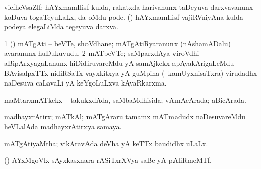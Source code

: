 {{{{{{\bentry
{} 
\gl{\nA}
\bmng
vicfheVsaZlf: 
\banum
{} hAYxmamIlisf kulda, rakatxda harivanunx taDeyuva darxvavanunx koDuva togaTeyuLaLx, \ame da oMdu pode. 
 (\kanmu) hAYxmamIlisf vajiRVniyAna kulda podeya elegaLiMda tegeyuva darxva. 
\eanum
\emng
\eentry

\bentry
{} 
\gl{\nA}
\expl{}
\bmng
\bnum
\num{1} (\ca) mATgAti -- beVTe, shoVdhane; mATgAtiRyaranunx (nAshamADalu) avaranunx huDukuvudu. 
\num{2} mATbeVTe; saMparxdAya viroVdhi aBipArxyagaLanunx hiDidiruvareMdu yA samAjkekx apAyakArigaLeMdu BAvisalpxTTx nidiRSaTx vayxkitxya yA guMpina (\kanmu\ kamUyxnisaTxra) virudadhx naDesuva caLavaLi yA keYgoLuLxva kAyaRkarxma. 
\enum
\emng
\eentry

\bentry
{} 
\gl{\gu}
\expl{}
\bmng
maMtarxmATkekx -- takukxdAda, saMbaMdhisida; vAmAcArada; aBicArada. 
\emng
\eentry

\bentry
{} 
\gl{\nA}
\expl{}
\bmng
madhayxrAtirx; mATkAl; mATgAraru tamamx mATmadudx naDesuvareMdu heVLalAda madhayxrAtirxya samaya. 
\emng
\eentry

\bentry
{} 
\gl{\gu}
\expl{}
\bmng
mATgAtiyaMtha; vikAravAda deVha yA keTTx baudidhx uLaLx. 
\emng
\eentry

\bentry
{} 
\gl{\nA}
\expl{}
\bmng
(\ca) AYxMgoVlx sAyxkasxnara rASiTxrXVya saBe yA pAliRmeMTf. 
\emng
\eentry

}}}}}}
